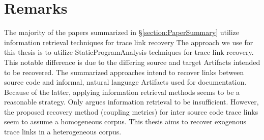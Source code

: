 \section{Remarks}
\label{section:Remarks}
The majority of the papers summarized in §\ref{section:PaperSummary} utilize information retrieval techniques for trace link recovery
\cite{DBLP:books/daglib/p/Zisman12} 
\cite{DBLP:conf/iwpc/AntoniolCLCM00}
\cite{DBLP:conf/wcre/AntoniolCLM99} 
\cite{DBLP:conf/icse/McMillanPR09}
\cite{DBLP:journals/tosem/LuciaFOT07}
\cite{DBLP:conf/icsm/BavotaCLFOP12}
\cite{DBLP:conf/wcre/AngiusW12}
\cite{DBLP:conf/icse/KlockGDP11}
The approach we use for this thesis is to utilize \gls{StaticProgramAnalysis} techniques for trace link recovery.
This notable difference is due to the differing source and target \glspl{Artifact} intended to be recovered.
The summarized approaches intend to recover links between source code and informal, natural language \glspl{Artifact} used for documentation.
Because of the latter, applying information retrieval methods seems to be a reasonable strategy.
Only \cite{DBLP:conf/icse/McMillanPR09} argues information retrieval to be insufficient.
However, the proposed recovery method (coupling metrics) for inter source code trace links seem to assume a homogeneous corpus.
This thesis aims to recover exogenous trace links in a heterogeneous corpus.
 

